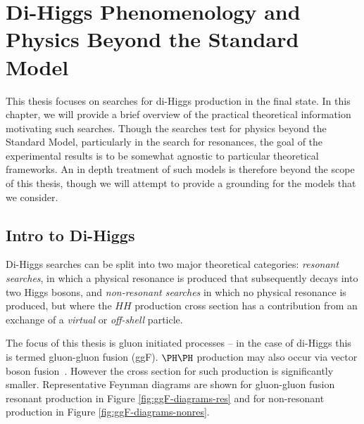 \chapter{Di-Higgs Phenomenology and Physics Beyond the Standard Model}
\label{chap:hh-bsm}
This thesis focuses on searches for di-Higgs production in the \bbbb final state. In this chapter,
we will provide a brief overview of the practical theoretical information motivating such searches. 
Though the searches test for physics beyond the Standard Model, particularly in the search for 
resonances, the goal of the experimental results is to be somewhat agnostic to particular 
theoretical frameworks. An in depth treatment of such models is therefore beyond the scope 
of this thesis, though we will attempt to provide a grounding for the models that we consider.

\section{Intro to Di-Higgs}
Di-Higgs searches can be split into two major theoretical categories: \emph{resonant searches}, in which a physical resonance is produced that subsequently decays into two Higgs bosons, and \emph{non-resonant searches} in which no physical resonance is produced, but where the $HH$ production cross section has a contribution from an exchange of a \emph{virtual} or \emph{off-shell} particle. 

The focus of this thesis is gluon initiated processes -- in the case of di-Higgs this is termed gluon-gluon fusion
(ggF). $\higgs\higgs$ production may also occur via vector boson fusion~\cite{HDBS-2018-18}. However the cross section for such production is significantly smaller. Representative Feynman diagrams are shown for gluon-gluon fusion 
resonant production in Figure \ref{fig:ggF-diagrams-res} and for non-resonant production in 
Figure \ref{fig:ggF-diagrams-nonres}.

